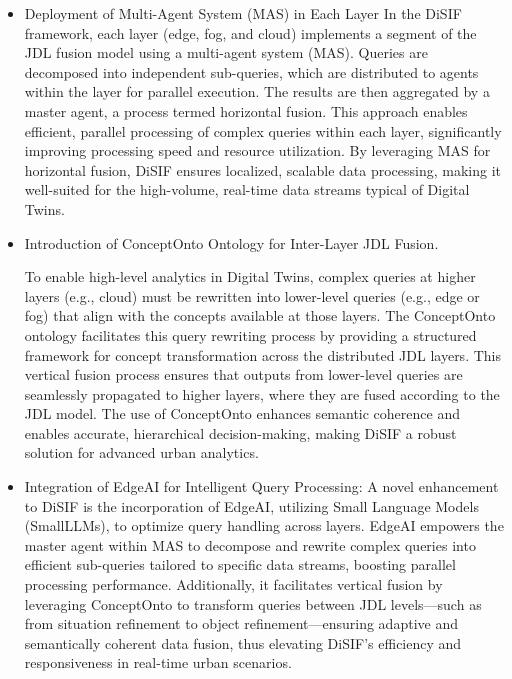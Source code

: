 \documentclass[5p,times]{elsarticle}
\begin{document}
\begin{itemize}
  Across the three-layer JDL model, vertical fusion is performed 
  to transform concepts between layers, utilizing conceptOnto 
  to facilitate serial concept transformation from edge to fog to cloud.
   This ensures semantic coherence across layers,
    enabling seamless data integration. Within each layer, 
    the MAS drives parallel and independent fusion operations,
     significantly improving processing speed and scalability
      compared to centralized models, making DiSIF a robust solution
       for Digital Twins.


  \item Deployment of Multi-Agent System (MAS) in Each Layer
  In the DiSIF framework, each layer (edge, fog, and cloud) implements a segment of the
   JDL fusion model using a multi-agent system (MAS). Queries are decomposed into
    independent sub-queries, which are distributed to agents within the layer 
    for parallel execution. The results are then aggregated by a master agent,
     a process termed horizontal fusion. This approach enables efficient, 
     parallel processing of complex queries within each layer, significantly
      improving processing speed and resource utilization. By leveraging MAS 
      for horizontal fusion, DiSIF ensures localized, scalable data processing,
       making it well-suited for the high-volume, real-time data streams typical of Digital Twins.

  \item Introduction of ConceptOnto Ontology for Inter-Layer JDL Fusion.
  
  To enable high-level analytics in Digital Twins, complex queries at higher layers
   (e.g., cloud) must be rewritten into lower-level queries (e.g., edge or fog) 
   that align with the concepts available at those layers. The ConceptOnto ontology
    facilitates this query rewriting process by providing a structured framework for
     concept transformation across the distributed JDL layers. This vertical fusion 
     process ensures that outputs from lower-level queries are seamlessly propagated to
      higher layers, where they are fused according to the JDL model. The use of
       ConceptOnto enhances semantic coherence and enables accurate, hierarchical
        decision-making, making DiSIF a robust solution for advanced urban analytics.

  \item Integration of EdgeAI for Intelligent Query Processing: 
  A novel enhancement to DiSIF is the incorporation of EdgeAI, 
  utilizing Small Language Models (SmallLLMs), to optimize query 
  handling across layers. EdgeAI empowers the master agent within MAS
   to decompose and rewrite complex queries into efficient sub-queries 
   tailored to specific data streams, boosting parallel processing performance.
    Additionally, it facilitates vertical fusion by leveraging 
    ConceptOnto to transform queries between JDL levels—such as
     from situation refinement to object refinement—ensuring adaptive 
     and semantically coherent data fusion, thus elevating DiSIF’s efficiency and responsiveness in real-time urban scenarios.
   

 \end{itemize}
\end{document}
